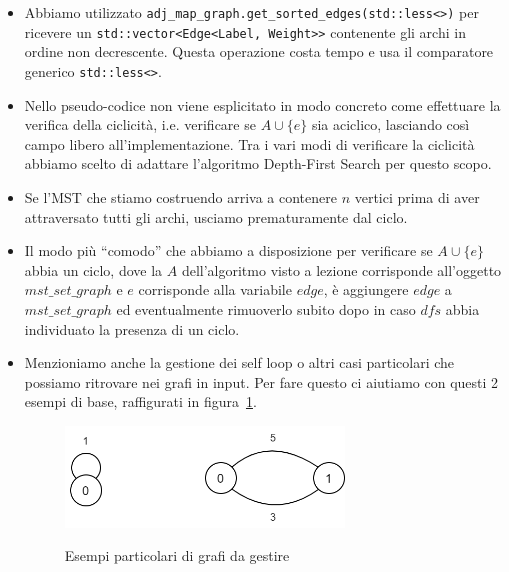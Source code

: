 \begin{itemize}
    \item Abbiamo utilizzato \texttt{adj_map_graph.get_sorted_edges(std::less<>{})} per ricevere un \texttt{std::vector<Edge<Label, Weight>>} contenente gli archi in ordine non decrescente. Questa operazione costa tempo \complexityMLogM{} e usa il comparatore generico \texttt{std::less<>}.\\
    
    \item Nello pseudo-codice non viene esplicitato in modo concreto come effettuare la verifica della ciclicità, i.e. verificare se $A \cup \{ e \}$ sia aciclico, lasciando così campo libero all'implementazione. Tra i vari modi di verificare la ciclicità abbiamo scelto di adattare l'algoritmo Depth-First Search per questo scopo.\\

    \item Se l'MST che stiamo costruendo arriva a contenere $n$ vertici prima di aver attraversato tutti gli archi, usciamo prematuramente dal ciclo.\\
    
    \item Il modo più ``comodo'' che abbiamo a disposizione per verificare se $A \cup \{ e \}$ abbia un ciclo, dove la $A$ dell'algoritmo visto a lezione corrisponde all'oggetto $mst\_set\_graph$ e $e$ corrisponde alla variabile $edge$, è aggiungere $edge$ a $mst\_set\_graph$ ed eventualmente rimuoverlo subito dopo in caso $dfs$ abbia individuato la presenza di un ciclo.\\
    
    \item Menzioniamo anche la gestione dei self loop o altri casi particolari che possiamo ritrovare nei grafi in input. Per fare questo ci aiutiamo con questi 2 esempi di base, raffigurati in figura~\ref{fig:SelfLoop}.

\begin{figure}[h]
	\caption{Esempi particolari di grafi da gestire}
	\centering
	\includegraphics[width=0.7\textwidth]{./images/ExampleSelfLoop.png}
	\label{fig:SelfLoop}
\end{figure}


\end{itemize}
